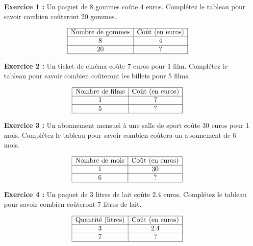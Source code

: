 \documentclass{article}
\begin{document}
\begin{tcolorbox}[colback=green!10!white, colframe=yellow!75!black, title=\textcolor{white}{Application directe}, 
                  sharp corners=south]
    \textbf{Exercice 1 :} Un paquet de 8 gommes coûte 4 euros. Complétez le tableau pour savoir combien coûteront 20 gommes.

    \[
    \begin{array}{|c|c|}
    \hline
    \text{Nombre de gommes} & \text{Coût (en euros)} \\
    \hline
    8 & 4 \\
    \hline
    20 & ? \\
    \hline
    \end{array}
    \]

    \textbf{Exercice 2 :} Un ticket de cinéma coûte 7 euros pour 1 film. Complétez le tableau pour savoir combien coûteront les billets pour 5 films.

    \[
    \begin{array}{|c|c|}
    \hline
    \text{Nombre de films} & \text{Coût (en euros)} \\
    \hline
    1 & 7 \\
    \hline
    5 & ? \\
    \hline
    \end{array}
    \]

    \textbf{Exercice 3 :} Un abonnement mensuel à une salle de sport coûte 30 euros pour 1 mois. Complétez le tableau pour savoir combien coûtera un abonnement de 6 mois.

    \[
    \begin{array}{|c|c|}
    \hline
    \text{Nombre de mois} & \text{Coût (en euros)} \\
    \hline
    1 & 30 \\
    \hline
    6 & ? \\
    \hline
    \end{array}
    \]

    \textbf{Exercice 4 :} Un paquet de 3 litres de lait coûte 2.4 euros. Complétez le tableau pour savoir combien coûteront 7 litres de lait.

    \[
    \begin{array}{|c|c|}
    \hline
    \text{Quantité (litres)} & \text{Coût (en euros)} \\
    \hline
    3 & 2.4 \\
    \hline
    7 & ? \\
    \hline
    \end{array}
    \]


\end{tcolorbox}
\end{document}
